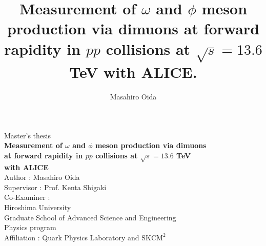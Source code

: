 \documentclass[11pt,a4paper,titlepage]{article}
\title{Measurement of $\omega$ and $\phi$ meson production via dimuons at forward rapidity in $pp$ collisions at $\sqrt{s}=13.6$ TeV with ALICE.}
\author{Masahiro Oida}
\date{}
\begin{document}
  \setlength{\headheight}{18.0pt}
  \addtolength{\topmargin}{-4.0pt}
  \setlength{\baselineskip}{1.2\baselineskip}
  \begin{titlepage}
    \centering  %
    \vspace*{30mm} %

    {\LARGE Master's thesis} \\[20mm] %
    
    {\LARGE \textbf{Measurement of $\omega$ and $\phi$ meson production via dimuons\\ at forward rapidity in $pp$ collisions at $\sqrt{s}=13.6$ TeV \\ with ALICE}} \\[50mm] %
  


    {\Large Author : Masahiro Oida} \\[10mm]
    {\Large Supervisor  : Prof. Kenta Shigaki} \\[5mm] %
    {\Large Co-Examiner :} \\[5mm] %

    {\large Hiroshima University \\
    Graduate School of Advanced Science and Engineering \\
    Physics program}\\[10mm]
    {\large Affiliation : Quark Physics Laboratory and $\mathrm{SKCM^2}$} \\[5mm]

  \end{titlepage}

    \setcounter{tocdepth}{3}
    \tableofcontents
    \newpage
    \setcounter{section}{0}
    
    
    
    
    
    
    \newpage
    \begin{thebibliography}{99}
      
    \end{thebibliography}
\end{document}
